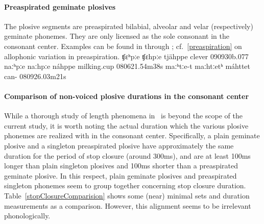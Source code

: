 \paragraph{Preaspirated geminate plosives}
The plosive segments \mbox{} are preaspirated bilabial, alveolar and velar (respectively) geminate phonemes. 
They are only licensed as the sole consonant in the consonant center.  
Examples can be found in  through ; cf.~\SEC\ref{preaspiration} on allophonic variation in preaspiration. 
		{ʧɛ{ʰpː}e}		{ʧɛ{hpː}e}		{tjähppe}	{clever\BS{}}		{090930b}{.077}
	{naː{ʰpː}e}	{naː{hpː}e}	{náhppe}	{milking.cup\BS{}}	{080621}{.54m38s}
			{maː{ʰtː}e-t}	{maː{htː}etʰ}	{máhttet}	{can-}			{080926}{.03m21s}


\paragraph[Non-voiced plosive durations in the consonant center]{Comparison of non-voiced plosive durations in the consonant center}\label{plosiveDurationComparison}
While a thorough study of length phenomena in \PS\ is beyond the scope of the current study, it is worth noting the actual duration which the various plosive phonemes are realized with in the consonant center. %
Specifically, %
a plain geminate plosive and a singleton preaspirated plosive have approximately the same duration for the period of stop closure (around 300ms), and are at least 100ms longer than plain singleton plosives and 100ms shorter than a preaspirated geminate plosive. In this respect, plain geminate plosives and preaspirated singleton phonemes seem to group together concerning stop closure duration. 
Table~\vref{stopClosureComparision} %
shows some (near) minimal sets and duration measurements as a comparison. However, this alignment seems to be irrelevant phonologically. 

